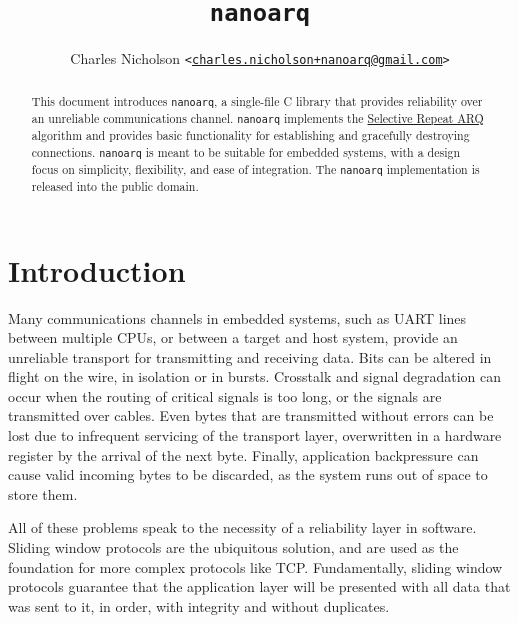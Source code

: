 \documentclass[11pt]{article}
\newcommand{\nanoarq}{\texttt{nanoarq}}
\begin{document}
\title{\nanoarq{}}
\author{Charles Nicholson \texttt{<\href{mailto:charles.nicholson+nanoarq@gmail.com}{charles.nicholson+nanoarq@gmail.com}>}}
\date{}
\maketitle

\begin{abstract}
    This document introduces \nanoarq{}, a single-file C library that provides reliability over an unreliable communications channel. \nanoarq{} implements the \href{https://en.wikipedia.org/wiki/Selective_Repeat_ARQ}{Selective Repeat ARQ}   algorithm and provides basic functionality for establishing and gracefully destroying connections. \nanoarq{} is meant to be suitable for embedded systems, with a design focus on simplicity, flexibility, and ease of integration. The \nanoarq{} implementation is released into the public domain.
\end{abstract}

\begin{spacing}{0.0}
\tableofcontents
\end{spacing}

\section{Introduction}
Many communications channels in embedded systems, such as UART lines between multiple CPUs, or between a target and host system, provide an unreliable transport for transmitting and receiving data. Bits can be altered in flight on the wire, in isolation or in bursts. Crosstalk and signal degradation can occur when the routing of critical signals is too long, or the signals are transmitted over cables. Even bytes that are transmitted without errors can be lost due to infrequent servicing of the transport layer, overwritten in a hardware register by the arrival of the next byte. Finally, application backpressure can cause valid incoming bytes to be discarded, as the system runs out of space to store them. \par

All of these problems speak to the necessity of a reliability layer in software. Sliding window protocols are the ubiquitous solution, and are used as the foundation for more complex protocols like TCP. Fundamentally, sliding window protocols guarantee that the application layer will be presented with all data that was sent to it, in order, with integrity and without duplicates. \par
\end{document}
